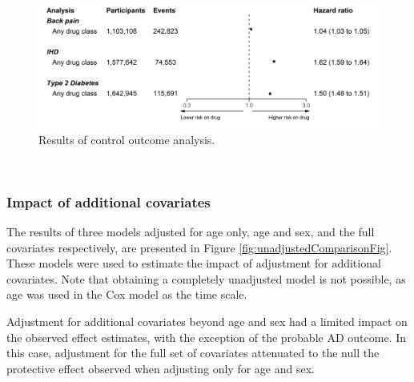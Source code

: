 \documentclass[a4paper, twoside]{templates/ociamthesis}
\begin{document}
\begin{figure}[H]
\includegraphics[width=1\linewidth]{figures/cprd-analysis/forester_control_outcomes} \caption[Results of control outcome analysis]{Results of control outcome analysis.}\label{fig:controlOutcomeFig}
\end{figure}

~

\hypertarget{impact-of-additional-covariates-1}{%
\subsubsection{Impact of additional covariates}\label{impact-of-additional-covariates-1}}

The results of three models adjusted for age only, age and sex, and the full covariates respectively, are presented in Figure \ref{fig:unadjustedComparisonFig}. These models were used to estimate the impact of adjustment for additional covariates. Note that obtaining a completely unadjusted model is not possible, as age was used in the Cox model as the time scale.

Adjustment for additional covariates beyond age and sex had a limited impact on the observed effect estimates, with the exception of the probable AD outcome. In this case, adjustment for the full set of covariates attenuated to the null the protective effect observed when adjusting only for age and sex.

~
\end{document}

